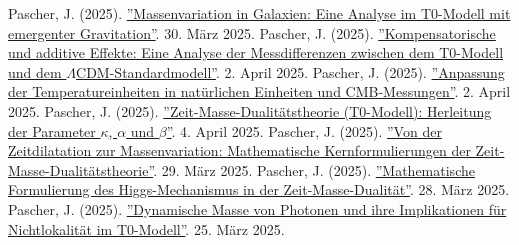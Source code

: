 \documentclass[a4paper,12pt]{article}
\theoremstyle{definition}
\theoremstyle{remark}
\begin{document}
	\begin{thebibliography}{99}
		 Pascher, J. (2025). \href{https://github.com/jpascher/T0-Time-Mass-Duality/tree/main/2/pdf/Deutsch/MassVarGalaxien.pdf}{''Massenvariation in Galaxien: Eine Analyse im T0-Modell mit emergenter Gravitation''}. 30. März 2025.
		 Pascher, J. (2025). \href{https://github.com/jpascher/T0-Time-Mass-Duality/tree/main/2/pdf/Deutsch/MessdifferenzenT0Standard.pdf}{''Kompensatorische und additive Effekte: Eine Analyse der Messdifferenzen zwischen dem T0-Modell und dem \(\Lambda\)CDM-Standardmodell''}. 2. April 2025.
		 Pascher, J. (2025). \href{https://github.com/jpascher/T0-Time-Mass-Duality/tree/main/2/pdf/Deutsch/NatEinheitenAlpha1.pdf}{''Anpassung der Temperatureinheiten in natürlichen Einheiten und CMB-Messungen''}. 2. April 2025.
		 Pascher, J. (2025). \href{https://github.com/jpascher/T0-Time-Mass-Duality/tree/main/2/pdf/Deutsch/ZeitMasseT0Params.pdf}{''Zeit-Masse-Dualitätstheorie (T0-Modell): Herleitung der Parameter \(\kappa\), \(\alpha\) und \(\beta\)''}. 4. April 2025.
		 Pascher, J. (2025). \href{https://github.com/jpascher/T0-Time-Mass-Duality/tree/main/2/pdf/Deutsch/MathZeitMasseLagrange.pdf}{''Von der Zeitdilatation zur Massenvariation: Mathematische Kernformulierungen der Zeit-Masse-Dualitätstheorie''}. 29. März 2025.
		 Pascher, J. (2025). \href{https://github.com/jpascher/T0-Time-Mass-Duality/tree/main/2/pdf/Deutsch/MathHiggsZeitMasse.pdf}{''Mathematische Formulierung des Higgs-Mechanismus in der Zeit-Masse-Dualität''}. 28. März 2025.
		 Pascher, J. (2025). \href{https://github.com/jpascher/T0-Time-Mass-Duality/tree/main/2/pdf/Deutsch/DynMassePhotonenNichtlokal.pdf}{''Dynamische Masse von Photonen und ihre Implikationen für Nichtlokalität im T0-Modell''}. 25. März 2025.
	\end{thebibliography}
	
\end{document}
